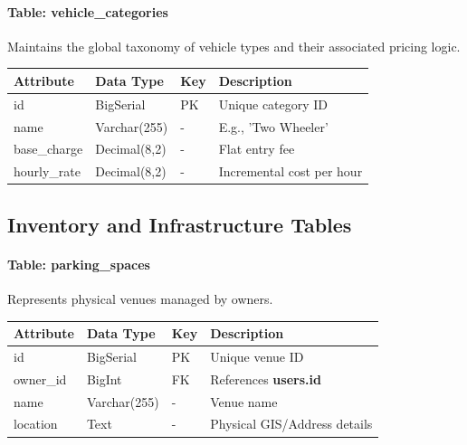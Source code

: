 \paragraph{Table: \textbf{vehicle\_categories}}
Maintains the global taxonomy of vehicle types and their associated pricing logic.
\begin{longtable}{|p{3cm}|p{3cm}|p{2cm}|p{6cm}|}
    \hline
    \textbf{Attribute} & \textbf{Data Type} & \textbf{Key} & \textbf{Description} \\
    \hline
    \endhead
    id & BigSerial & PK & Unique category ID \\
    \hline
    name & Varchar(255) & - & E.g., 'Two Wheeler' \\
    \hline
    base\_charge & Decimal(8,2) & - & Flat entry fee \\
    \hline
    hourly\_rate & Decimal(8,2) & - & Incremental cost per hour \\
    \hline
\end{longtable}

\subsection{Inventory and Infrastructure Tables}

\paragraph{Table: \textbf{parking\_spaces}}
Represents physical venues managed by owners.
\begin{longtable}{|p{3cm}|p{3cm}|p{2cm}|p{6cm}|}
    \hline
    \textbf{Attribute} & \textbf{Data Type} & \textbf{Key} & \textbf{Description} \\
    \hline
    \endhead
    id & BigSerial & PK & Unique venue ID \\
    \hline
    owner\_id & BigInt & FK & References \textbf{users.id} \\
    \hline
    name & Varchar(255) & - & Venue name \\
    \hline
    location & Text & - & Physical GIS/Address details \\
    \hline
\end{longtable}

